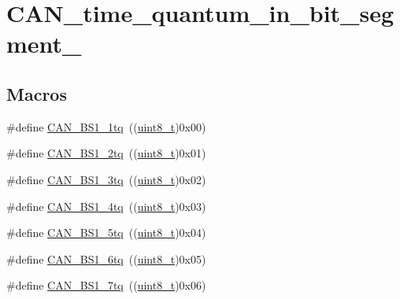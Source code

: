 \hypertarget{group___c_a_n__time__quantum__in__bit__segment__1}{}\section{C\+A\+N\+\_\+time\+\_\+quantum\+\_\+in\+\_\+bit\+\_\+segment\+\_}
\label{group___c_a_n__time__quantum__in__bit__segment__1}
\subsection*{Macros}
\begin{DoxyCompactItemize}
\item 
\#define \hyperlink{group___c_a_n__time__quantum__in__bit__segment__1_ga76b8fb0815b7a3f398fffe72dda0bc04}{C\+A\+N\+\_\+\+B\+S1\+\_\+1tq}~((\hyperlink{_p_e___types_8h_aba7bc1797add20fe3efdf37ced1182c5}{uint8\+\_\+t})0x00)
\item 
\#define \hyperlink{group___c_a_n__time__quantum__in__bit__segment__1_ga1544ecf902e6173859d60cff9530971a}{C\+A\+N\+\_\+\+B\+S1\+\_\+2tq}~((\hyperlink{_p_e___types_8h_aba7bc1797add20fe3efdf37ced1182c5}{uint8\+\_\+t})0x01)
\item 
\#define \hyperlink{group___c_a_n__time__quantum__in__bit__segment__1_gaa808099663480de935d3ce9187c2dcab}{C\+A\+N\+\_\+\+B\+S1\+\_\+3tq}~((\hyperlink{_p_e___types_8h_aba7bc1797add20fe3efdf37ced1182c5}{uint8\+\_\+t})0x02)
\item 
\#define \hyperlink{group___c_a_n__time__quantum__in__bit__segment__1_ga7c5c668200f41991e14b31ca20235000}{C\+A\+N\+\_\+\+B\+S1\+\_\+4tq}~((\hyperlink{_p_e___types_8h_aba7bc1797add20fe3efdf37ced1182c5}{uint8\+\_\+t})0x03)
\item 
\#define \hyperlink{group___c_a_n__time__quantum__in__bit__segment__1_ga31dea95492dababfcf79bcaeb884b99e}{C\+A\+N\+\_\+\+B\+S1\+\_\+5tq}~((\hyperlink{_p_e___types_8h_aba7bc1797add20fe3efdf37ced1182c5}{uint8\+\_\+t})0x04)
\item 
\#define \hyperlink{group___c_a_n__time__quantum__in__bit__segment__1_gaa7fc6fcdf9c1c70ee9700b35e32e205e}{C\+A\+N\+\_\+\+B\+S1\+\_\+6tq}~((\hyperlink{_p_e___types_8h_aba7bc1797add20fe3efdf37ced1182c5}{uint8\+\_\+t})0x05)
\item 
\#define \hyperlink{group___c_a_n__time__quantum__in__bit__segment__1_gafec90578d657073a671b6326f3bfcf8e}{C\+A\+N\+\_\+\+B\+S1\+\_\+7tq}~((\hyperlink{_p_e___types_8h_aba7bc1797add20fe3efdf37ced1182c5}{uint8\+\_\+t})0x06)

\end{DoxyCompactItemize}

